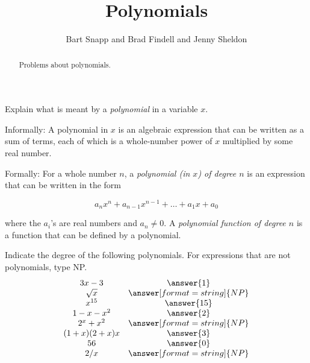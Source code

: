 \documentclass[nooutcomes]{ximera}
\title{Polynomials}
\author{Bart Snapp and Brad Findell and Jenny Sheldon}
\begin{document}
\begin{abstract}
Problems about polynomials.
\end{abstract}
\maketitle

\begin{problem}Explain what is meant by a \textit{polynomial} in a variable $x$.  
\begin{freeResponse}
\begin{hint}
Informally: A polynomial in $x$ is an algebraic expression that can be written as a sum of terms, each of which is a whole-number power of $x$ multiplied by some real number.  

Formally: For a whole number $n$, a \emph{polynomial (in $x$) of degree $n$} is an expression that can be written in the form 

$$a_nx^n+a_{n-1}x^{n-1}+\dots+a_1x + a_0$$

where the $a_i$'s are real numbers and $a_n\ne 0$.  
A \emph{polynomial function of degree $n$} is a function that can be defined by a polynomial.  

\end{hint}
\end{freeResponse}
\end{problem} 


\begin{problem}
Indicate the degree of the following polynomials.  For expressions that are not polynomials, type NP.
\[
\begin{array}{cc}
 3x-3 &     \answer{1} \\
 \sqrt{x} & \answer[format=string]{NP} \\
 x^{15}  & \answer{15} \\
 1-x-x^2 & \answer{2} \\
 2^x + x^2     & \answer[format=string]{NP} \\
 (1+x)(2+x)x & \answer{3} \\
 56      & \answer{0} \\
 2/x & \answer[format=string]{NP}  
\end{array}
\]
\end{problem}
\end{document}
